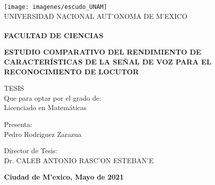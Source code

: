 \begin{titlepage}
\begin{center}

\texttt{[image: imagenes/escudo\_UNAM]} \\

\textsc {\large UNIVERSIDAD NACIONAL AUT'ONOMA DE M'EXICO} \\
\textsc{\bfseries \\FACULTAD DE CIENCIAS\\
}

\bigskip
\bigskip
\bigskip
\bigskip
\bigskip
\bigskip
\bigskip

\textsc{\bfseries ESTUDIO COMPARATIVO DEL RENDIMIENTO DE CARACTER\'ISTICAS DE LA SEÑAL DE VOZ PARA EL RECONOCIMIENTO DE LOCUTOR}

\bigskip
\bigskip
\bigskip
\bigskip
\bigskip

\begin{minipage}{\textwidth}
\centering
{TESIS \\ Que para optar por el grado de: \\
Licenciado en Matem\'aticas} \\

\bigskip
\bigskip
\bigskip
\bigskip


Presenta: \\
Pedro Rodriguez Zarazua\\

\bigskip
\bigskip
\bigskip
\bigskip

Director de Tesis: \\
Dr. CALEB ANTONIO RASC'ON ESTEBAN'E
\end{minipage}

\bigskip
\bigskip
\bigskip
\bigskip
\bigskip
\bigskip
\bigskip
\bigskip
\bigskip

\vfill

{\large \bfseries Ciudad de M'exico, 
Mayo de 2021}

\end{center}
\end{titlepage}
